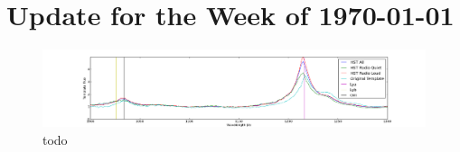 \documentclass[11pt]{article}
\begin{document}
\section*{Update for the Week of \today}

\begin{figure}[h]
  \centering
  \includegraphics[width=18cm]{CompareTemplates.png}
  \caption{todo}
  \label{fig:todo}
\end{figure}
\end{document}
